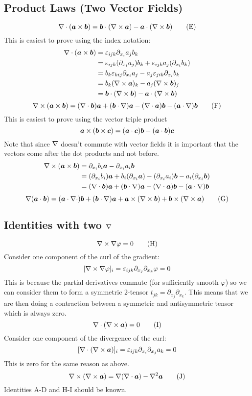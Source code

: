 \documentclass{article}
\newcommand{\pdvx}[1]{\partial_{x_{#1}}}
\begin{document}
    \subsection{Product Laws (Two Vector Fields)}
    \[\nabla\cdot(\bm{a}\times\bm{b}) = \bm{b}\cdot(\nabla\times\bm{a}) - \bm{a}\cdot(\nabla\times\bm{b}) \tag{E}\]
    This is easiest to prove using the index notation:
    \begin{align*}
    \div(\vv a\times\vv b) &= \varepsilon_{ijk}\pdvx i a_jb_k\\
    &= \varepsilon_{ijk}(\pdvx ia_j)b_k + \varepsilon_{ijk}a_j(\pdvx ib_k)\\
    &= b_k\varepsilon_{kij}\pdvx i a_j - a_j\varepsilon_{jik}\pdvx ib_k\\
    &= b_k(\curl \vv a)_k - a_j(\curl \vv b)_j\\
    &= \vv b\cdot(\curl\vv b) - \vv a\cdot(\curl\vv b)
    \end{align*}
    \[\nabla\times(\bm{a}\times\bm{b}) = (\nabla\cdot\bm{b})\bm{a} + (\bm{b}\cdot\nabla)\bm{a} - (\nabla\cdot \bm{a})\bm{b} - (\bm{a}\cdot\nabla)\bm{b}\tag{F}\]
    This is easiest to prove using the vector triple product
    \[\bm{a}\times(\bm{b} \times\bm{c}) = (\bm{a}\cdot\bm{c})\bm{b} - (\bm{a}\cdot\bm{b})\bm{c}\]
    Note that since \(\nabla\) doesn't commute with vector fields it is important that the vectors come after the dot products and not before.
    \begin{align*}
        \curl (\vv a\times\vv b) &= \pdvx i b_i\vv a - \pdvx i a_i\vv b\\
        &= (\pdvx ib_i)\vv a + b_i(\pdvx i\vv a) - (\pdvx ia_i)\vv b - a_i(\pdvx i\vv b)\\
        &= (\div\vv b)\vv a + (\vv b\cdot\grad)\vv a - (\div\vv a)\vv b - (\vv a\cdot\grad)\vv b
    \end{align*}
    \[\nabla(\bm{a}\cdot\bm{b}) = (\bm{a}\cdot\nabla\cdot)\bm{b} + (\bm{b}\cdot\nabla)\bm{a} + \bm{a}\times(\nabla\times\bm{b}) + \bm{b}\times(\nabla\times\bm{a})\tag{G}\]
    
    \subsection{Identities with two \(\nabla\)}
    \[\nabla\times\nabla\varphi = 0\tag{H}\]
    Consider one component of the curl of the gradient:
    \[[\curl\grad\varphi]_i = \varepsilon_{ijk}\pdvx j\pdvx k\varphi = 0\]
    This is because the partial derivatives commute (for sufficiently smooth \(\varphi\)) so we can consider them to form a symmetric 2-tensor \(t_{jk} = \pdvx j\pdvx k\).
    This means that we are then doing a contraction between a symmetric and antisymmetric tensor which is always zero.
    \[\nabla\cdot(\nabla\times\bm{a}) = 0\tag{I}\]
    Consider one component of the divergence of the curl:
    \[[\div(\curl\vv a)]_i = \varepsilon_{ijk}\pdvx i\pdvx j a_k = 0\]
    This is zero for the same reason as above.
    \[\curl(\curl\vv a) = \grad(\div\vv a) - \laplacian \vv a\tag{J}\]
    Identities A-D and H-I should be known.
    
\end{document}
